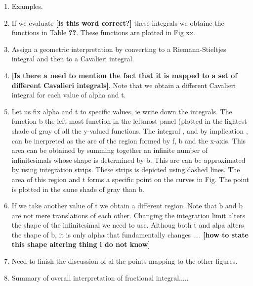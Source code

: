 \documentclass{article}
\theoremstyle{theorem}
\theoremstyle{definition}
\begin{document}
\begin{enumerate}
 \item Examples.
 \item If we evaluate \textbf{[is this word correct?]} these integrals we obtaine the functions in Table \textbf{??}. These functions are plotted in Fig xx.
 \item Assign a geometric interpretation by converting to a Riemann-Stieltjes integral and then to a Cavalieri integral.
 \item \textbf{[Is there a need to mention the fact that it is mapped to a set of different Cavalieri integrals]}. Note that we obtain a different 
 Cavalieri integral for each value of alpha and t.
 \item Let us fix alpha and t to specific values, ie write down the integrals. The function b the left most function in the leftmost panel (plotted in the lightest 
 shade of gray of all the y-valued functions. The integral , and by implication , can be inerpreted as the are of the region formed by f, b and the x-axis. This 
 area can be obtained by summing together an infinite number of infinitesimals whose shape is determined by b. This are can be approximated by using integration strips. These 
 strips is depicted using dashed lines. The area of this region and $t$ forms a specific point on the curves in Fig. The point is plotted in the same shade of gray than b.
 \item If we take another value of t we obtain a different region. Note that b and b are not mere translations of each other. Changing the integration limit alters the 
 shape of the infinitesimal we need to use. Althoug both t and alpa alters the shape of b, it is only alpha that fundamentally changes .... \textbf{[how to state this shape altering thing i do not know]} 
 \item Need to finish the discussion of al the points mapping to the other figures. 
 \item Summary of overall interpretation of fractional integral.....
\end{enumerate}
\end{document}
